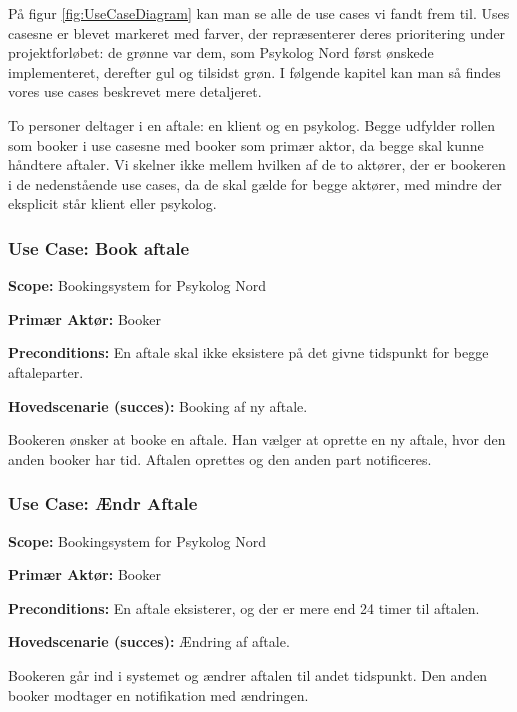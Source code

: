 På figur \ref{fig:UseCaseDiagram} kan man se alle de use cases vi fandt frem til.
Uses casesne er blevet markeret med farver, der repræsenterer deres prioritering under projektforløbet: de grønne var dem, som Psykolog Nord først ønskede implementeret, derefter gul og tilsidst grøn.
I følgende kapitel kan man så findes vores use cases beskrevet mere detaljeret. 

To personer deltager i en aftale: en klient og en psykolog. Begge udfylder rollen som booker i use casesne med booker som primær aktor, da begge skal kunne håndtere aftaler. 
Vi skelner ikke mellem hvilken af de to aktører, der er bookeren i de nedenstående use cases, da de skal gælde for begge aktører, med mindre der eksplicit står klient eller psykolog.

\subsubsection{Use Case: Book aftale}\label{usecase:bookaftale}
{\setlength{\parindent}{0cm}
\textbf{Scope:} Bookingsystem for Psykolog Nord

\textbf{Primær Aktør:} Booker

\textbf{Preconditions:} En aftale skal ikke eksistere på det givne tidspunkt for begge aftaleparter.

\textbf{Hovedscenarie (succes):} Booking af ny aftale.

Bookeren ønsker at booke en aftale. 
Han vælger at oprette en ny aftale, hvor den anden booker har tid. 
Aftalen oprettes og den anden part notificeres.
}

\subsubsection{Use Case: Ændr Aftale}
{\setlength{\parindent}{0cm}
\textbf{Scope:} Bookingsystem for Psykolog Nord

\textbf{Primær Aktør:} Booker 

\textbf{Preconditions:} En aftale eksisterer, og der er mere end 24 timer til aftalen.

\textbf{Hovedscenarie (succes):} Ændring af aftale.

Bookeren går ind i systemet og ændrer aftalen til andet tidspunkt.
Den anden booker modtager en notifikation med ændringen.
}

